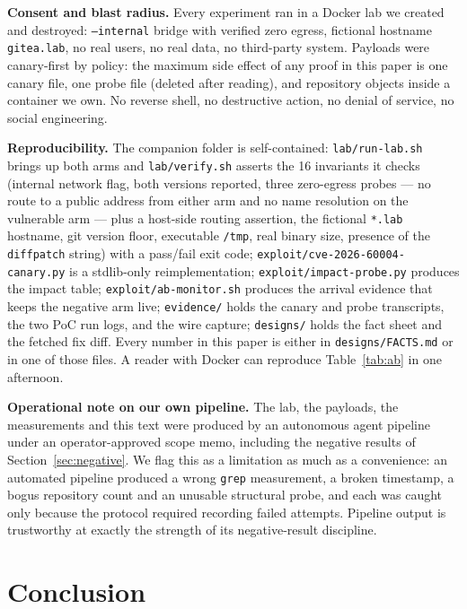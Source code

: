\documentclass[journal]{IEEEtran}
\begin{document}
\textbf{Consent and blast radius.} Every experiment ran in a Docker lab we
created and destroyed: \texttt{--internal} bridge with verified zero egress,
fictional hostname \texttt{gitea.lab}, no real users, no real data, no
third-party system. Payloads were canary-first by policy: the maximum side
effect of any proof in this paper is one canary file, one probe file (deleted
after reading), and repository objects inside a container we own. No reverse
shell, no destructive action, no denial of service, no social engineering.

\textbf{Reproducibility.} The companion folder is self-contained:
\texttt{lab/run-lab.sh} brings up both arms and \texttt{lab/verify.sh} asserts
the 16 invariants it checks (internal network flag, both versions reported,
three zero-egress probes --- no route to a public address from either arm and no
name resolution on the vulnerable arm --- plus a host-side routing assertion, the
fictional \texttt{*.lab} hostname, git version floor, executable \texttt{/tmp},
real binary size, presence of the \texttt{diffpatch} string) with a pass/fail
exit code;
\texttt{exploit/cve-2026-60004-canary.py} is a stdlib-only reimplementation;
\texttt{exploit/impact-probe.py} produces the impact table;
\texttt{exploit/ab-monitor.sh} produces the arrival evidence that keeps the
negative arm live; \texttt{evidence/} holds the canary and probe transcripts,
the two PoC run logs, and the wire capture; \texttt{designs/} holds the fact
sheet and the fetched fix diff. Every number in this paper is either in
\texttt{designs/FACTS.md} or in one of those files. A reader with Docker can
reproduce Table~\ref{tab:ab} in one afternoon.

\textbf{Operational note on our own pipeline.} The lab, the payloads, the
measurements and this text were produced by an autonomous agent pipeline under
an operator-approved scope memo, including the negative results of
Section~\ref{sec:negative}. We flag this as a limitation as much as a
convenience: an automated pipeline produced a wrong \texttt{grep} measurement,
a broken timestamp, a bogus repository count and an unusable structural probe,
and each was caught only because the protocol required recording failed
attempts. Pipeline output is trustworthy at exactly the strength of its
negative-result discipline.

\section{Conclusion}
\label{sec:conclusion}
\end{document}

